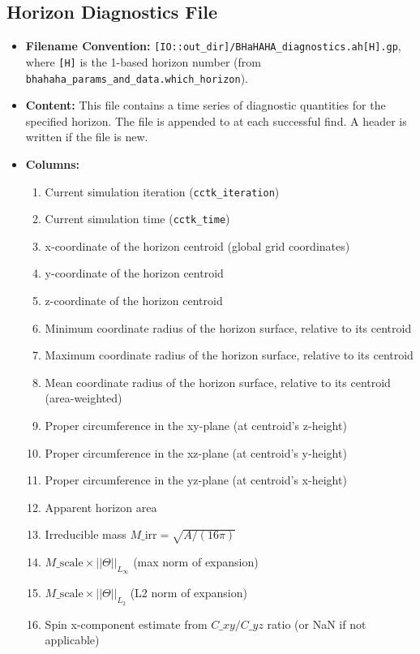 \documentclass[a4paper,11pt]{article}
\newcommand{\file}[1]{{\tt #1}}
\begin{document}
\subsection{Horizon Diagnostics File}
\label{ssec:output_diag}
\begin{itemize}
    \item \textbf{Filename Convention:} \file{[IO::out\_dir]/BHaHAHA\_diagnostics.ah[H].gp}, where \texttt{[H]} is the 1-based horizon number (from \texttt{bhahaha\_params\_and\_data.which\_horizon}).
    \item \textbf{Content:} This file contains a time series of diagnostic quantities for the specified horizon. The file is appended to at each successful find. A header is written if the file is new.
    \item \textbf{Columns:}
    \begin{enumerate}
        \item Current simulation iteration (\texttt{cctk\_iteration})
        \item Current simulation time (\texttt{cctk\_time})
        \item x-coordinate of the horizon centroid (global grid coordinates)
        \item y-coordinate of the horizon centroid
        \item z-coordinate of the horizon centroid
        \item Minimum coordinate radius of the horizon surface, relative to its centroid
        \item Maximum coordinate radius of the horizon surface, relative to its centroid
        \item Mean coordinate radius of the horizon surface, relative to its centroid (area-weighted)
        \item Proper circumference in the xy-plane (at centroid's z-height)
        \item Proper circumference in the xz-plane (at centroid's y-height)
        \item Proper circumference in the yz-plane (at centroid's x-height)
        \item Apparent horizon area
        \item Irreducible mass $M\_{\text{irr}} = \sqrt{A / (16\pi)}$
        \item $M\_{\text{scale}} \times ||\Theta||_{L_\infty}$ (max norm of expansion)
        \item $M\_{\text{scale}} \times ||\Theta||_{L_2}$ (L2 norm of expansion)
        \item Spin x-component estimate from $C\_{xy}/C\_{yz}$ ratio (or NaN if not applicable)

\end{enumerate}
\end{itemize}
\end{document}
